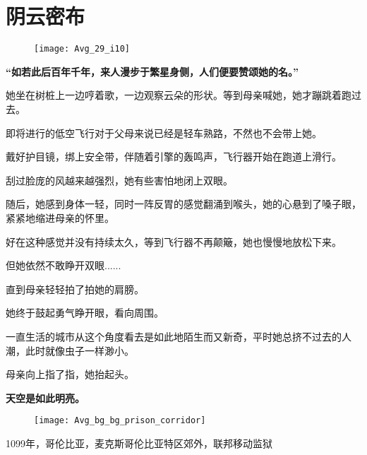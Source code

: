\documentclass[openany]{book}
\begin{document}
\mainmatter
\chapter{阴云密布}
\begin{figure}[h]
    \centering
    \texttt{[image: Avg\_29\_i10]}
\end{figure}
\begin{center} \textbf{“如若此后百年千年，来人漫步于繁星身侧，人们便要赞颂她的名。”}\end{center} \par
她坐在树桩上一边哼着歌，一边观察云朵的形状。等到母亲喊她，她才蹦跳着跑过去。\par
即将进行的低空飞行对于父母来说已经是轻车熟路，不然也不会带上她。\par
戴好护目镜，绑上安全带，伴随着引擎的轰鸣声，飞行器开始在跑道上滑行。\par
刮过脸庞的风越来越强烈，她有些害怕地闭上双眼。\par
随后，她感到身体一轻，同时一阵反胃的感觉翻涌到喉头，她的心悬到了嗓子眼，紧紧地缩进母亲的怀里。\par
好在这种感觉并没有持续太久，等到飞行器不再颠簸，她也慢慢地放松下来。\par
但她依然不敢睁开双眼......\par
直到母亲轻轻拍了拍她的肩膀。\par
她终于鼓起勇气睁开眼，看向周围。\par
一直生活的城市从这个角度看去是如此地陌生而又新奇，平时她总挤不过去的人潮，此时就像虫子一样渺小。\par
母亲向上指了指，她抬起头。\par
\begin{center} \textbf{天空是如此明亮。}\end{center}

\begin{figure}[h]
    \centering
    \texttt{[image: Avg\_bg\_bg\_prison\_corridor]}
\end{figure}
1099年，哥伦比亚，麦克斯哥伦比亚特区郊外，联邦移动监狱\par
\end{document}
